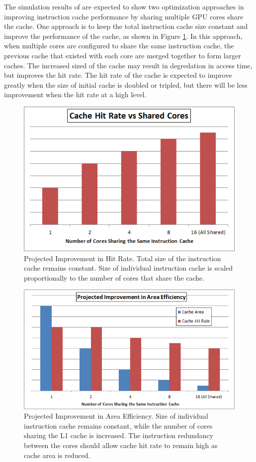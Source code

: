 The simulation results of are expected to show two optimization
approaches in improving instruction cache performance by sharing
multiple GPU cores share the cache. 
One approach is to keep the total instruction cache size constant and
improve the performance of the cache, as shown in Figure
\ref{HitImprov}. 
In this approach, when multiple cores are configured to share the same
instruction cache, the previous cache that existed with each core are
merged together to form larger caches. 
The increased sized of the cache may result in degredation in access
time, but improves the hit rate. 
The hit rate of the cache is expected to improve greatly when the size
of initial cache is doubled or tripled, but there will be less
improvement when the hit rate at a high level.


\begin{figure}[t]
\centering
\includegraphics[width=\columnwidth]{graphics/HitRateImprov.png}
\caption{Projected Improvement in Hit Rate. Total size of the instruction cache remains constant. Size of individual instruction cache is scaled proportionally to the number of cores that share the cache.}
\label{HitImprov}
\end{figure}


\begin{figure}[b!]
\centering
\includegraphics[width=\columnwidth]{graphics/AreaEff.png}
\caption{Projected Improvement in Area Efficiency. Size of individual instruction cache remains constant, while the number of cores sharing the L1 cache is increased. The instruction redundancy between the cores should allow cache hit rate to remain high as cache area is reduced. }
\label{AreaEff}
\end{figure}


